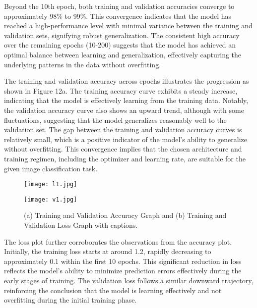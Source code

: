 \documentclass[journal,article,submit,pdftex,moreauthors]{Definitions/mdpi}
\begin{document}
Beyond the 10th epoch, both training and validation accuracies converge to approximately 98\% to 99\%. This convergence indicates that the model has reached a high-performance level with minimal variance between the training and validation sets, signifying robust generalization. The consistent high accuracy over the remaining epochs (10-200) suggests that the model has achieved an optimal balance between learning and generalization, effectively capturing the underlying patterns in the data without overfitting.

The training and validation accuracy across epochs illustrates the progression as shown in Figure 12a. The training accuracy curve exhibits a steady increase, indicating that the model is effectively learning from the training data. Notably, the validation accuracy curve also shows an upward trend, although with some fluctuations, suggesting that the model generalizes reasonably well to the validation set. The gap between the training and validation accuracy curves is relatively small, which is a positive indicator of the model's ability to generalize without overfitting. This convergence implies that the chosen architecture and training regimen, including the optimizer and learning rate, are suitable for the given image classification task.

\begin{figure}[h]
    \centering
    \begin{minipage}{0.49\textwidth}
        \centering
        \texttt{[image: l1.jpg]}
        \caption*{}
    \end{minipage}
    \hfill
    \begin{minipage}{0.49\textwidth}
        \centering
        \texttt{[image: v1.jpg]}
        \caption*{}
    \end{minipage}
    \caption{(a) Training and Validation Accuracy Graph and (b) Training and Validation Loss Graph with captions.}
    \label{fig:side_by_side}
\end{figure}


The loss plot further corroborates the observations from the accuracy plot. Initially, the training loss starts at around 1.2, rapidly decreasing to approximately 0.1 within the first 10 epochs. This significant reduction in loss reflects the model's ability to minimize prediction errors effectively during the early stages of training. The validation loss follows a similar downward trajectory, reinforcing the conclusion that the model is learning effectively and not overfitting during the initial training phase.
\end{document}
